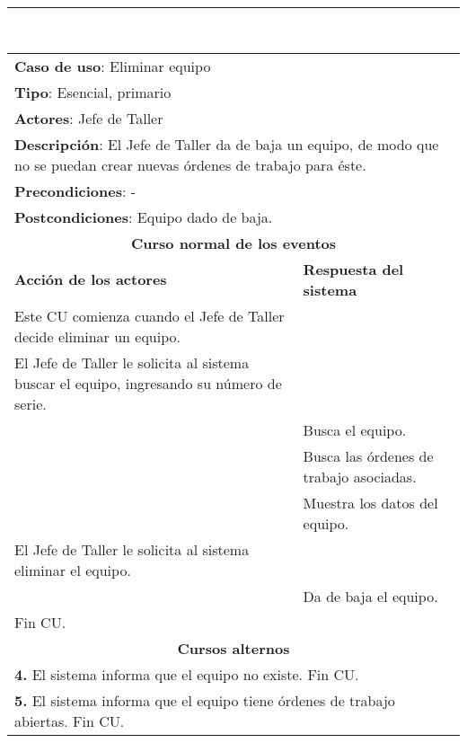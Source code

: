     \setcounter{step}{0}

    \noindent\rule{169mm}{0.8mm}\\

	\begin{longtable}{ |p{8cm}|p{8cm}| }
		\hline
		\multicolumn{2}{|p{16cm}|}{\textbf{Caso de uso}: Eliminar equipo}\\
		\multicolumn{2}{|p{16cm}|}{\textbf{Tipo}: Esencial, primario}\\
		\multicolumn{2}{|p{16cm}|}{\textbf{Actores}: Jefe de Taller}\\
		\multicolumn{2}{|p{16cm}|}{\textbf{Descripción}: El Jefe de Taller da de baja un equipo, de modo que no se puedan crear nuevas órdenes de trabajo para éste.}\\
		\multicolumn{2}{|p{16cm}|}{\textbf{Precondiciones}: -}\\
		\multicolumn{2}{|p{16cm}|}{\textbf{Postcondiciones}: Equipo dado de baja.}\\
		\hline
		\multicolumn{2}{|c|}{\textbf{Curso normal de los eventos}}\\
		\hline
		\textbf{Acción de los actores} & \textbf{Respuesta del sistema}\\
		\hline
			\inc Este CU comienza cuando el Jefe de Taller decide eliminar un equipo.& \\
			\hline
			\inc El Jefe de Taller le solicita al sistema buscar el equipo, ingresando su número de serie. &\\
			\hline
			& \inc Busca el equipo.\\
			\hline
			& \inc Busca las órdenes de trabajo asociadas.\\
			\hline
			& \inc Muestra los datos del equipo.\\
			\hline
			\inc El Jefe de Taller le solicita al sistema eliminar el equipo.&\\
			\hline
			& \inc Da de baja el equipo.\\
			\hline
			\inc Fin CU. & \\
		\hline
		\multicolumn{2}{|c|}{\textbf{Cursos alternos}}\\
		\hline
		\multicolumn{2}{|p{16cm}|}{\textbf{4. }El sistema informa que el equipo no existe. Fin CU. }\\
		\hline
		\multicolumn{2}{|p{16cm}|}{\textbf{5. }El sistema informa que el equipo tiene órdenes de trabajo abiertas. Fin CU.}\\
		\hline	
	\end{longtable}


